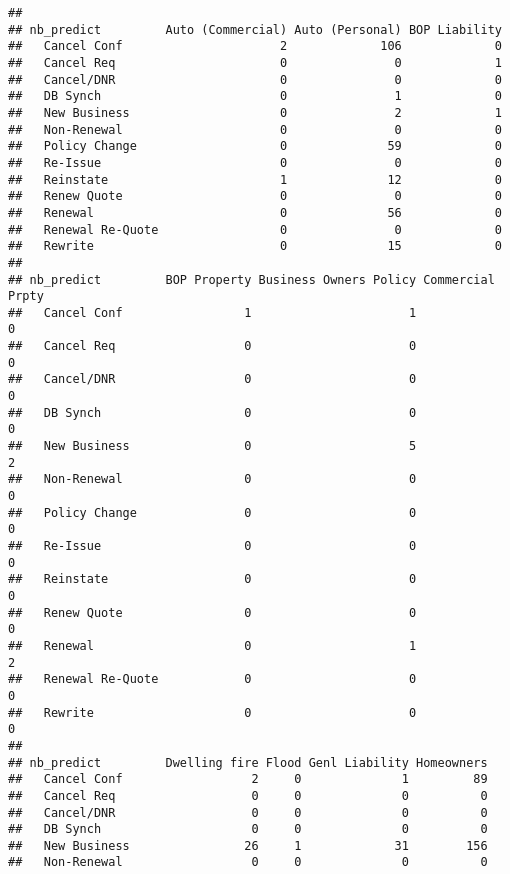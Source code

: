 \documentclass[]{article}
\begin{document}
\begin{verbatim}
##                   
## nb_predict         Auto (Commercial) Auto (Personal) BOP Liability
##   Cancel Conf                      2             106             0
##   Cancel Req                       0               0             1
##   Cancel/DNR                       0               0             0
##   DB Synch                         0               1             0
##   New Business                     0               2             1
##   Non-Renewal                      0               0             0
##   Policy Change                    0              59             0
##   Re-Issue                         0               0             0
##   Reinstate                        1              12             0
##   Renew Quote                      0               0             0
##   Renewal                          0              56             0
##   Renewal Re-Quote                 0               0             0
##   Rewrite                          0              15             0
##                   
## nb_predict         BOP Property Business Owners Policy Commercial Prpty
##   Cancel Conf                 1                      1                0
##   Cancel Req                  0                      0                0
##   Cancel/DNR                  0                      0                0
##   DB Synch                    0                      0                0
##   New Business                0                      5                2
##   Non-Renewal                 0                      0                0
##   Policy Change               0                      0                0
##   Re-Issue                    0                      0                0
##   Reinstate                   0                      0                0
##   Renew Quote                 0                      0                0
##   Renewal                     0                      1                2
##   Renewal Re-Quote            0                      0                0
##   Rewrite                     0                      0                0
##                   
## nb_predict         Dwelling fire Flood Genl Liability Homeowners
##   Cancel Conf                  2     0              1         89
##   Cancel Req                   0     0              0          0
##   Cancel/DNR                   0     0              0          0
##   DB Synch                     0     0              0          0
##   New Business                26     1             31        156
##   Non-Renewal                  0     0              0          0

\end{verbatim}
\end{document}
